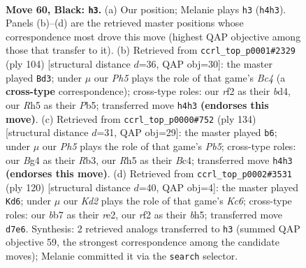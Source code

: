 \documentclass[11pt]{article}
\begin{document}
\clearpage

\begin{figure}[p]\centering
\begin{subfigure}{0.46\textwidth}\centering
\resizebox{\linewidth}{!}{%
\newchessgame
\chessboard[
  setfen={8/1B1k4/1B6/7r/PK4bp/1P3N2/5R2/8 b - - 2 60},
  showmover=false,
  pgfstyle=straightmove, color=movearrow, markmove={h4-h3}
]}
\caption{}
\end{subfigure}\hfill
\begin{subfigure}{0.46\textwidth}\centering
\resizebox{\linewidth}{!}{%
\newchessgame
\chessboard[
  setfen={8/8/1nR5/1P2p1kp/2Bb4/8/7K/8 w - - 1 53},
  showmover=false,
  pgfstyle=straightmove, color=movearrow, markmove={c4-d3}
]}
\caption{}
\end{subfigure}
\\[4pt]
\begin{subfigure}{0.46\textwidth}\centering
\resizebox{\linewidth}{!}{%
\newchessgame
\chessboard[
  setfen={7r/5pk1/6p1/1P2b3/2B3P1/1Rn5/5BK1/8 w - - 2 68},
  showmover=false,
  pgfstyle=straightmove, color=movearrow, markmove={b5-b6}
]}
\caption{}
\end{subfigure}\hfill
\begin{subfigure}{0.46\textwidth}\centering
\resizebox{\linewidth}{!}{%
\newchessgame
\chessboard[
  setfen={8/5pkp/2K5/3BP2b/5R1P/8/4r3/8 w - - 19 61},
  showmover=false,
  pgfstyle=straightmove, color=movearrow, markmove={c6-d6}
]}
\caption{}
\end{subfigure}
\caption{\textbf{Move 60, Black: \texttt{h3}.} (a) Our position; Melanie plays \texttt{h3} (\texttt{h4h3}). Panels (b)--(d) are the retrieved master positions whose correspondence most drove this move (highest QAP objective among those that transfer to it). (b) Retrieved from \texttt{ccrl\_top\_p0001\#2329} (ply 104) [structural distance $d$=36, QAP obj=30]: the master played \texttt{Bd3}; under $\mu$ our \emph{Ph5} plays the role of that game's \emph{Bc4} (a \textbf{cross-type} correspondence); cross-type roles: our \emph{r}f2 as their \emph{b}d4, our \emph{R}h5 as their \emph{P}b5; transferred move \texttt{h4h3} \textbf{(endorses this move)}. (c) Retrieved from \texttt{ccrl\_top\_p0000\#752} (ply 134) [structural distance $d$=31, QAP obj=29]: the master played \texttt{b6}; under $\mu$ our \emph{Ph5} plays the role of that game's \emph{Pb5}; cross-type roles: our \emph{B}g4 as their \emph{R}b3, our \emph{R}h5 as their \emph{B}c4; transferred move \texttt{h4h3} \textbf{(endorses this move)}. (d) Retrieved from \texttt{ccrl\_top\_p0002\#3531} (ply 120) [structural distance $d$=40, QAP obj=4]: the master played \texttt{Kd6}; under $\mu$ our \emph{Kd2} plays the role of that game's \emph{Kc6}; cross-type roles: our \emph{b}b7 as their \emph{r}e2, our \emph{r}f2 as their \emph{b}h5; transferred move \texttt{d7e6}. Synthesis: 2 retrieved analogs transferred to \texttt{h3} (summed QAP objective 59, the strongest correspondence among the candidate moves); Melanie committed it via the \texttt{search} selector.}
\label{fig:thought-m119}
\end{figure}
\end{document}
